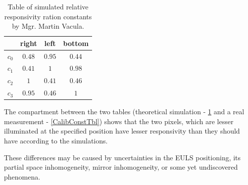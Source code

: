 \begin{table}[H]
\centering
\begin{tabular}{|c|c|c|c|}
\hline
   & right & left & bottom \\ \hline
$c_0$ & $0.48$    & $0.95$   & $0.44$     \\ \hline
$c_1$ & $0.41$    & $1$   	 & $0.98$      \\ \hline
$c_2$ & $1$    	  & $0.41$   & $0.46$      \\ \hline
$c_3$ & $0.95$    & $0.46$   & $1$      \\ \hline
\end{tabular}
\caption{Table of simulated relative responsivity ration constants by Mgr. Martin Vacula.}
 \label{CalibConstTblSim}
\end{table}

The compartment between the two tables (theoretical simulation - \ref{CalibConstTblSim} and a real measurement - \ref{CalibConstTbl}) shows that the two pixels, which are lesser illuminated at the specified position have lesser responsivity than they should have according to the simulations.

\par
These differences may be caused by uncertainties in the EULS positioning, its partial space inhomogeneity, mirror inhomogeneity, or some yet undiscovered phenomena.





